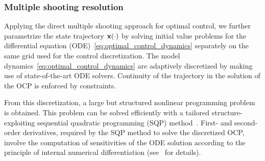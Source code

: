 \subsubsection*{Multiple shooting resolution}
Applying the direct multiple shooting approach for optimal control, we further parametrize the state trajectory ${\bf x}(\cdot)$ by solving initial value problems for the differential equation (ODE)~\eqref{eq:optimal_control_dynamics} separately on the same grid used for the control discretization.
The model dynamics~\eqref{eq:optimal_control_dynamics} are adaptively discretized by making use of state-of-the-art ODE solvers.
Continuity of the trajectory in the solution of the OCP is enforced by constraints.

From this discretization, a large but structured nonlinear programming problem is obtained.
This problem can be solved efficiently with a tailored structure-exploiting sequential quadratic programming (SQP) method~\cite{leineweber2003efficient}.
First- and second-order derivatives, required by the SQP method to solve the discretized OCP, involve the computation of sensitivities of the ODE solution according to the principle of internal numerical differentiation (see~\cite{bock1981numerical} for details).

